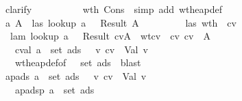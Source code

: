 \begin{isabellebody}
\ \ \ \ \ \ \ \ \isamarkupfalse \ clarify\ \isamarkupfalse \isanewline
\ \ \ \ \ \ \ \ \isamarkupfalse \ wt{\isacharunderscore}h\ Cons\ \isamarkupfalse \ {\isacharparenleft}simp\ add{\isacharcolon}\ wt{\isacharunderscore}heap{\isacharunderscore}def{\isacharparenright}\ \isanewline
\ \ \ \ \ \ \isamarkupfalse \ {\isacharminus}\isanewline
\ \ \ \ \ \ \ \ \isamarkupfalse \ a{\isacharprime}\ A{\isacharprime}\ \isamarkupfalse \ las{}{\isacharcolon}\ {\isachardoublequoteopen}lookup\ a{\isacharprime}\ {\isasymSigma}\ {\isacharequal}\ Result\ A{\isacharprime}{\isachardoublequoteclose}\isanewline
\ \ \ \ \ \ \ \ \isamarkupfalse \ las{}\ wt{\isacharunderscore}h\ \isamarkupfalse \ cv{\isacharprime}\ \isanewline
\ \ \ \ \ \ \ \ \ \ lam{}{\isacharcolon}\ {\isachardoublequoteopen}lookup\ a{\isacharprime}\ {\isasymmu}\ {\isacharequal}\ Result\ {\isacharparenleft}cv{\isacharprime}{\isacharcomma}A{\isacharprime}{\isacharparenright}{\isachardoublequoteclose}\ \ wtcv{}{\isacharcolon}\ {\isachardoublequoteopen}{\isasymSigma}\ {\isasymturnstile}cv\ cv{\isacharprime}\ {\isacharcolon}\ A{\isacharprime}{\isachardoublequoteclose}\ \isanewline
\ \ \ \ \ \ \ \ \ \ \ cval{}{\isacharcolon}\ {\isachardoublequoteopen}a{\isacharprime}\ {\isasymnotin}\ {\isacharparenleft}set\ ads{\isacharparenright}\ {\isasymlongrightarrow}\ {\isacharparenleft}{\isasymexists}\ v{\isachardot}\ cv{\isacharprime}\ {\isacharequal}\ Val\ v{\isacharparenright}{\isachardoublequoteclose}\ \isanewline
\ \ \ \ \ \ \ \ \ \ \isamarkupfalse \ wt{\isacharunderscore}heap{\isacharunderscore}def{\isacharbrackleft}of\ {\isasymSigma}\ {\isasymmu}\ {\isachardoublequoteopen}set\ ads{\isachardoublequoteclose}{\isacharbrackright}\ \isamarkupfalse \ blast\ \isamarkupfalse \isanewline
\ \ \ \ \ \ \ \ \isamarkupfalse \ ap{\isacharunderscore}ads{\isacharcolon}\ {\isachardoublequoteopen}{\isacharparenleft}a{\isacharprime}\ {\isasymnotin}\ set\ ads{\isacharprime}\ {\isasymlongrightarrow}\ {\isacharparenleft}{\isasymexists}\ v{\isachardot}\ cv{\isacharprime}\ {\isacharequal}\ Val\ v{\isacharparenright}{\isacharparenright}{\isachardoublequoteclose}\ \isanewline
\ \ \ \ \ \ \ \ \isamarkupfalse \isanewline
\ \ \ \ \ \ \ \ \ \ \isamarkupfalse \ ap{\isacharunderscore}adsp{\isacharcolon}\ {\isachardoublequoteopen}a{\isacharprime}\ {\isasymnotin}\ set\ ads{\isacharprime}{\isachardoublequoteclose}\isanewline

\end{isabellebody}
